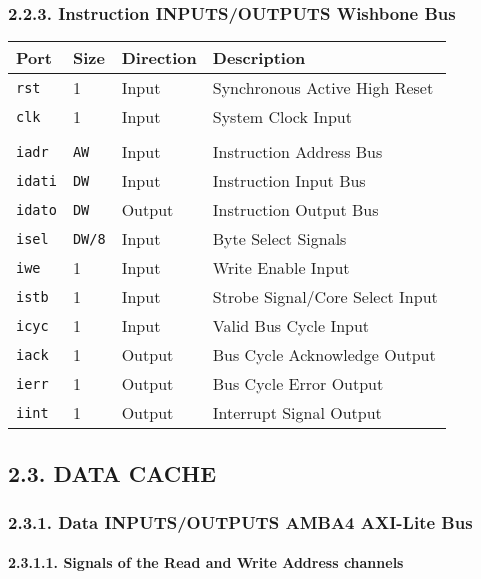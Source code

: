 \documentclass[]{article}
\let\oldparagraph\paragraph
\renewcommand{\paragraph}[1]{\oldparagraph{#1}\mbox{}}
\begin{document}
\subsubsection{2.2.3. Instruction INPUTS/OUTPUTS Wishbone
Bus}\label{instruction-inputsoutputs-wishbone-bus}

\begin{longtable}[]{@{}llll@{}}
\toprule
Port & Size & Direction & Description\tabularnewline
\midrule
\endhead
\texttt{rst} & 1 & Input & Synchronous Active High Reset\tabularnewline
\texttt{clk} & 1 & Input & System Clock Input\tabularnewline
& & &\tabularnewline
\texttt{iadr} & \texttt{AW} & Input & Instruction Address
Bus\tabularnewline
\texttt{idati} & \texttt{DW} & Input & Instruction Input
Bus\tabularnewline
\texttt{idato} & \texttt{DW} & Output & Instruction Output
Bus\tabularnewline
\texttt{isel} & \texttt{DW/8} & Input & Byte Select
Signals\tabularnewline
\texttt{iwe} & 1 & Input & Write Enable Input\tabularnewline
\texttt{istb} & 1 & Input & Strobe Signal/Core Select
Input\tabularnewline
\texttt{icyc} & 1 & Input & Valid Bus Cycle Input\tabularnewline
\texttt{iack} & 1 & Output & Bus Cycle Acknowledge Output\tabularnewline
\texttt{ierr} & 1 & Output & Bus Cycle Error Output\tabularnewline
\texttt{iint} & 1 & Output & Interrupt Signal Output\tabularnewline
\bottomrule
\end{longtable}

\subsection{2.3. DATA CACHE}\label{data-cache}

\subsubsection{2.3.1. Data INPUTS/OUTPUTS AMBA4 AXI-Lite
Bus}\label{data-inputsoutputs-amba4-axi-lite-bus}

\paragraph{2.3.1.1. Signals of the Read and Write Address
channels}\label{signals-of-the-read-and-write-address-channels-1}
\end{document}
